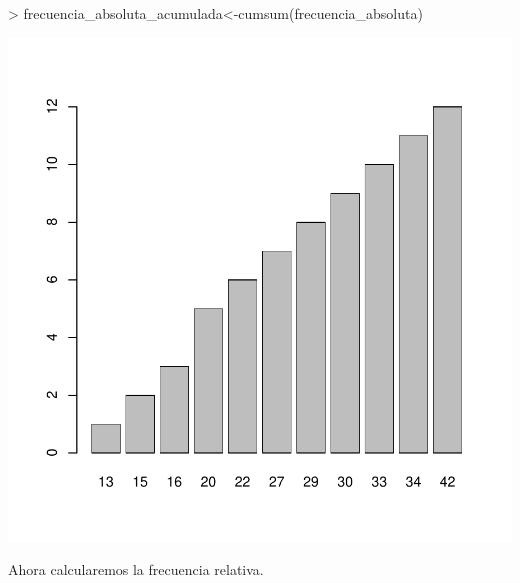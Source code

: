 \documentclass [a4paper] {article}
\begin{document}
\begin{Schunk}
\begin{Sinput}
> frecuencia_absoluta_acumulada<-cumsum(frecuencia_absoluta)
\end{Sinput}
\end{Schunk}
\begin{center}
\includegraphics{entrega-frecuencia_absoluta_acumulada_satelites_plot}
\end{center}

Ahora calcularemos la frecuencia relativa.
\end{document}
